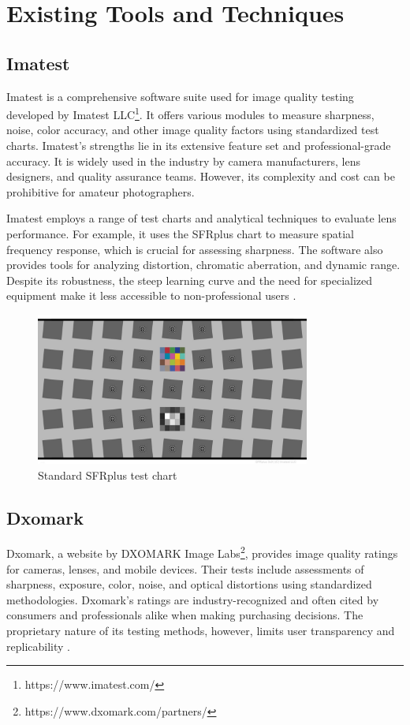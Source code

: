 \section{Existing Tools and Techniques}

\subsection{Imatest}
Imatest is a comprehensive software suite used for image quality testing developed by Imatest LLC\footnote[1]{https://www.imatest.com/}. It offers various modules to measure sharpness, noise, color accuracy, and other image quality factors using standardized test charts. Imatest's strengths lie in its extensive feature set and professional-grade accuracy. It is widely used in the industry by camera manufacturers, lens designers, and quality assurance teams. However, its complexity and cost can be prohibitive for amateur photographers.

Imatest employs a range of test charts and analytical techniques to evaluate lens performance. For example, it uses the SFRplus chart to measure spatial frequency response, which is crucial for assessing sharpness. The software also provides tools for analyzing distortion, chromatic aberration, and dynamic range. Despite its robustness, the steep learning curve and the need for specialized equipment make it less accessible to non-professional users \cite[]{ImatestAbout}.

\begin{figure}[h]
\centering
\includegraphics[height=5cm]{Images/SFRplus_chart.jpg}
\caption{Standard SFRplus test chart \cite{ImatestSFRChart}}
\label{fig:psf}
\end{figure}

\subsection{Dxomark}
Dxomark, a website by DXOMARK Image Labs\footnote[1]{https://www.dxomark.com/partners/}, provides image quality ratings for cameras, lenses, and mobile devices. Their tests include assessments of sharpness, exposure, color, noise, and optical distortions using standardized methodologies. Dxomark's ratings are industry-recognized and often cited by consumers and professionals alike when making purchasing decisions. The proprietary nature of its testing methods, however, limits user transparency and replicability \cite{DxomarkTestingLenses}.

